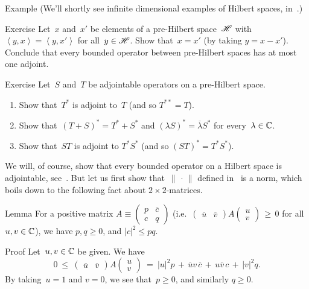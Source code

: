 \documentclass[a]{subfiles}
\begin{document}
\begin{parsec}[hilb]
\begin{point}{Example}
(We'll shortly see infinite dimensional examples of Hilbert spaces,
in~\sref{}.)
\end{point}

\begin{point}{Exercise}%
Let~$x$ and~$x'$ be elements of a pre-Hilbert space~$\mathscr{H}$
with $\left<y,x\right>=\left<y,x'\right>$
for all~$y\in\mathscr{H}$.
Show that~$x=x'$ (by taking $y=x-x'$).
Conclude that every bounded operator between pre-Hilbert spaces
has at most one adjoint.
\end{point}
\begin{point}{Exercise}%
Let~$S$ and~$T$ be adjointable operators on a pre-Hilbert space.
\begin{enumerate}
\item
Show that~$T^*$ is adjoint to~$T$ (and so $T^{**}=T$).
\item
Show that~$(T+S)^*=T^*+S^*$
and $(\lambda S)^*=\overline{\lambda}S^*$
for every~$\lambda\in \mathbb{C}$.
\item
Show that~$ST$ is adjoint to $T^*S^*$ (and so $(ST)^*=T^*S^*$).
\end{enumerate}
We will, of course, show
that every bounded operator on a Hilbert space is adjointable,
see~.
But let us first show that~$\|\,\cdot\,\|$
defined in~ is a norm,
which boils down to the following fact
about  $2\times 2$-matrices.
\end{point}
\begin{point}{Lemma}%
For a positive matrix $A\equiv 
\left(\begin{smallmatrix}p & \overline{c} \\ c & q\end{smallmatrix}\right)$
(i.e.~$\left(
\begin{smallmatrix}\overline{u}&\overline{v}\end{smallmatrix}\right)
A
\left(\begin{smallmatrix}u \\ v \end{smallmatrix}\right) \,\geq \, 0$
for all~$u,v\in \mathbb{C}$),
we have
$p,q\geq 0$, and $\left|c\right|^2 \leq pq$.
\begin{point}{Proof}%
Let~$u,v\in\mathbb{C}$ be given.
We have
\begin{equation*}
0\ \leq\ 
\left(\begin{smallmatrix}\overline{u}&\overline{v}\end{smallmatrix}\right)
A
\left(\begin{smallmatrix}u \\ v \end{smallmatrix}\right)
\ = \ 
\left|u\right|^2 p\,+\, 
\overline{u}v\,\overline{c} \,+\,
u\overline{v}\,c \,+\,
\left|v\right|^2 q.
\end{equation*}
By taking~$u=1$ and $v=0$, we see that~$p\geq 0$,
and similarly $q\geq 0$.


\end{point}
\end{point}
\end{parsec}
\end{document}
